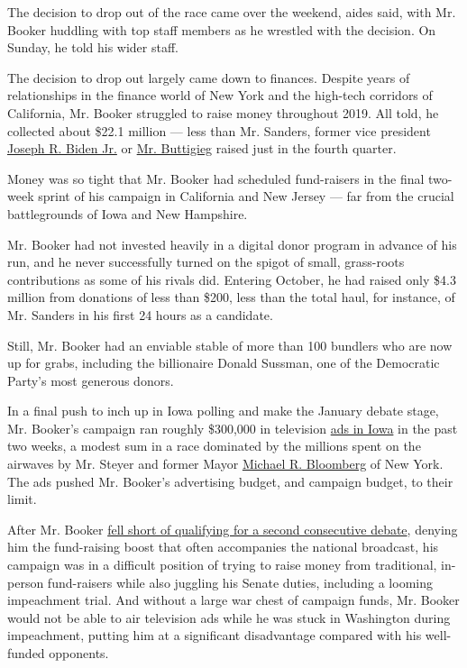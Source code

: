 The decision to drop out of the race came over the weekend, aides said,
with Mr. Booker huddling with top staff members as he wrestled with the
decision. On Sunday, he told his wider staff.

The decision to drop out largely came down to finances. Despite years of
relationships in the finance world of New York and the high-tech
corridors of California, Mr. Booker struggled to raise money throughout
2019. All told, he collected about \$22.1 million --- less than Mr.
Sanders, former vice president
\href{https://www.nytimes.com/interactive/2020/us/elections/joe-biden.html}{Joseph
R. Biden Jr.} or
\href{https://www.nytimes.com/interactive/2020/us/elections/pete-buttigieg.html}{Mr.
Buttigieg} raised just in the fourth quarter.

Money was so tight that Mr. Booker had scheduled fund-raisers in the
final two-week sprint of his campaign in California and New Jersey ---
far from the crucial battlegrounds of Iowa and New Hampshire.

Mr. Booker had not invested heavily in a digital donor program in
advance of his run, and he never successfully turned on the spigot of
small, grass-roots contributions as some of his rivals did. Entering
October, he had raised only \$4.3 million from donations of less than
\$200, less than the total haul, for instance, of Mr. Sanders in his
first 24 hours as a candidate.

Still, Mr. Booker had an enviable stable of more than 100 bundlers who
are now up for grabs, including the billionaire Donald Sussman, one of
the Democratic Party's most generous donors.

In a final push to inch up in Iowa polling and make the January debate
stage, Mr. Booker's campaign ran roughly \$300,000 in television
\href{https://www.youtube.com/watch?v=CBybCrdTv_U}{ads in Iowa} in the
past two weeks, a modest sum in a race dominated by the millions spent
on the airwaves by Mr. Steyer and former Mayor
\href{https://www.nytimes.com/interactive/2020/us/elections/michael-bloomberg.html}{Michael
R. Bloomberg} of New York. The ads pushed Mr. Booker's advertising
budget, and campaign budget, to their limit.

After Mr. Booker
\href{https://www.nytimes.com/interactive/2019/us/politics/democratic-debate-lineup.html}{fell
short of qualifying for a second consecutive debate}, denying him the
fund-raising boost that often accompanies the national broadcast, his
campaign was in a difficult position of trying to raise money from
traditional, in-person fund-raisers while also juggling his Senate
duties, including a looming impeachment trial. And without a large war
chest of campaign funds, Mr. Booker would not be able to air television
ads while he was stuck in Washington during impeachment, putting him at
a significant disadvantage compared with his well-funded opponents.


